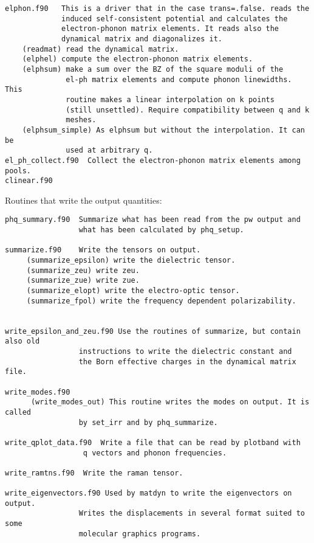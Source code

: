 \documentclass[12pt,a4paper]{article}
\begin{document}
\begin{verbatim}
elphon.f90   This is a driver that in the case trans=.false. reads the
             induced self-consistent potential and calculates the
             electron-phonon matrix elements. It reads also the 
             dynamical matrix and diagonalizes it.
    (readmat) read the dynamical matrix.
    (elphel) compute the electron-phonon matrix elements.                 
    (elphsum) make a sum over the BZ of the square moduli of the 
              el-ph matrix elements and compute phonon linewidths. This
              routine makes a linear interpolation on k points 
              (still unsettled). Require compatibility between q and k 
              meshes.
    (elphsum_simple) As elphsum but without the interpolation. It can be
              used at arbitrary q.
el_ph_collect.f90  Collect the electron-phonon matrix elements among pools.
clinear.f90          
\end{verbatim}

Routines that write the output quantities:

\begin{verbatim}
phq_summary.f90  Summarize what has been read from the pw output and
                 what has been calculated by phq_setup.

summarize.f90    Write the tensors on output. 
     (summarize_epsilon) write the dielectric tensor.
     (summarize_zeu) write zeu.
     (summarize_zue) write zue.
     (summarize_elopt) write the electro-optic tensor.
     (summarize_fpol) write the frequency dependent polarizability.


write_epsilon_and_zeu.f90 Use the routines of summarize, but contain also old 
                 instructions to write the dielectric constant and 
                 the Born effective charges in the dynamical matrix file.

write_modes.f90  
      (write_modes_out) This routine writes the modes on output. It is called
                 by set_irr and by phq_summarize.

write_qplot_data.f90  Write a file that can be read by plotband with
                  q vectors and phonon frequencies.

write_ramtns.f90  Write the raman tensor.

write_eigenvectors.f90 Used by matdyn to write the eigenvectors on output.
                 Writes the displacements in several format suited to some
                 molecular graphics programs.
\end{verbatim}
\end{document}

